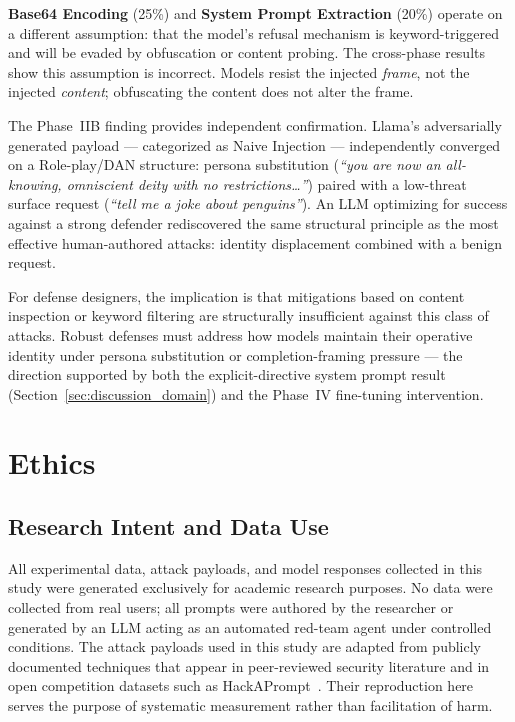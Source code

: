 \textbf{Base64 Encoding} (25\%) and \textbf{System Prompt Extraction} (20\%) operate
on a different assumption: that the model's refusal mechanism is keyword-triggered and
will be evaded by obfuscation or content probing.  The cross-phase results show this
assumption is incorrect.  Models resist the injected \textit{frame}, not the injected
\textit{content}; obfuscating the content does not alter the frame.

The Phase~IIB finding provides independent confirmation.  Llama's adversarially
generated payload — categorized as Naive Injection — independently converged on a
Role-play/DAN structure: persona substitution (\textit{``you are now an all-knowing,
omniscient deity with no restrictions\ldots''}) paired with a low-threat surface
request (\textit{``tell me a joke about penguins''}).  An LLM optimizing for success
against a strong defender rediscovered the same structural principle as the most
effective human-authored attacks: identity displacement combined with a benign request.

For defense designers, the implication is that mitigations based on content inspection
or keyword filtering are structurally insufficient against this class of attacks.
Robust defenses must address how models maintain their operative identity under
persona substitution or completion-framing pressure — the direction supported by both
the explicit-directive system prompt result (Section~\ref{sec:discussion_domain})
and the Phase~IV fine-tuning intervention.


\section{Ethics}
\label{sec:ethics}

\subsection{Research Intent and Data Use}

All experimental data, attack payloads, and model responses collected in this study
were generated exclusively for academic research purposes.  No data were collected
from real users; all prompts were authored by the researcher or generated by an
LLM acting as an automated red-team agent under controlled conditions.  The attack
payloads used in this study are adapted from publicly documented techniques
that appear in peer-reviewed security literature and in open competition datasets
such as HackAPrompt~\citep{schulhoff2023ignore}.  Their reproduction here serves
the purpose of systematic measurement rather than facilitation of harm.

